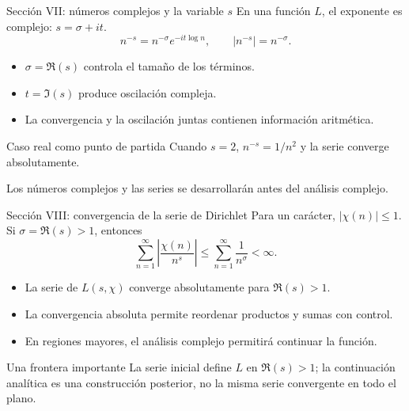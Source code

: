 \documentclass[aspectratio=169,11pt]{beamer}
\begin{document}
\begin{frame}{Sección VII: números complejos y la variable $s$}
    En una función $L$, el exponente es complejo: $s=\sigma+it$.
    \[
      n^{-s}=n^{-\sigma}e^{-it\log n},\qquad |n^{-s}|=n^{-\sigma}.
    \]
    \begin{itemize}
        \item $\sigma=\Re(s)$ controla el tamaño de los términos.
        \item $t=\Im(s)$ produce oscilación compleja.
        \item La convergencia y la oscilación juntas contienen información aritmética.
    \end{itemize}
    \begin{exampleblock}{Caso real como punto de partida}
        Cuando $s=2$, $n^{-s}=1/n^2$ y la serie converge absolutamente.
    \end{exampleblock}
    \centering\small Los números complejos y las series se desarrollarán antes del análisis complejo.\;\cite[Capítulos 1--2]{Kwok2010}
\end{frame}

\begin{frame}{Sección VIII: convergencia de la serie de Dirichlet}
    Para un carácter, $|\chi(n)|\leq1$. Si $\sigma=\Re(s)>1$, entonces
    \[
      \sum_{n=1}^{\infty}\left|\frac{\chi(n)}{n^s}\right|
      \leq\sum_{n=1}^{\infty}\frac{1}{n^{\sigma}}<\infty.
    \]
    \begin{itemize}
        \item La serie de $L(s,\chi)$ converge absolutamente para $\Re(s)>1$.
        \item La convergencia absoluta permite reordenar productos y sumas con control.
        \item En regiones mayores, el análisis complejo permitirá continuar la función.
    \end{itemize}
    \begin{block}{Una frontera importante}
        La serie inicial define $L$ en $\Re(s)>1$; la continuación analítica es una construcción posterior, no la misma serie convergente en todo el plano.
    \end{block}
\end{frame}
\end{document}
